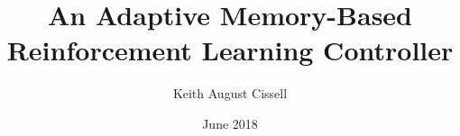 \documentclass[12pt]{report}
\begin{document}
\title{An Adaptive Memory-Based Reinforcement Learning Controller}
\author{Keith August Cissell}
\date{June 2018}

\maketitle



% 

\tableofcontents
\newpage







% 





\end{document}
